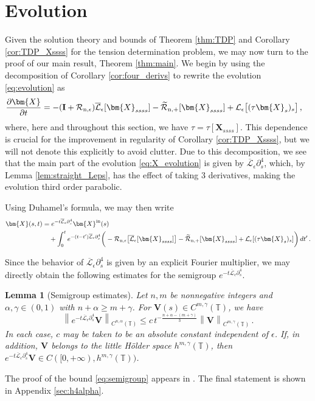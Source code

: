 \documentclass[11pt,reqno]{amsart}
\newcommand{\T}{\mathbb{T}}
\newcommand{\X}{\bm{X}}
\newcommand{\p}{\partial}
\newcommand{\norm}[1]{\left\lVert #1 \right\rVert}
\newcommand{\wt}[1]{\widetilde{#1}}
\newcommand{\mc}[1]{\mathcal{#1}}
\newtheorem{lemma}[theorem]{Lemma}
\theoremstyle{definition}
\begin{document}
\section{Evolution}\label{sec:evolution}
Given the solution theory and bounds of Theorem \ref{thm:TDP} and Corollary \ref{cor:TDP_Xssss} for the tension determination problem, we may now turn to the proof of our main result, Theorem \ref{thm:main}. We begin by using the decomposition of Corollary \ref{cor:four_derivs} to rewrite the evolution \eqref{eq:evolution} as 
\begin{equation}\label{eq:X_evolution}
\begin{aligned}
\frac{\p\X}{\p t} 
&= - ({\bf I}+\mc{R}_{\rm n,\epsilon})\overline{\mc{L}}_\epsilon[\X_{ssss}] - \wt{\mc{R}}_{\rm n,+}[\X_{ssss}] + \mc{L}_\epsilon\big[(\tau\X_s)_s\big]\,,
\end{aligned}
\end{equation}
where, here and throughout this section, we have $\tau=\tau[\X_{ssss}]$. This dependence is crucial for the improvement in regularity of Corollary \ref{cor:TDP_Xssss}, but we will not denote this explicitly to avoid clutter.
Due to this decomposition, we see that the main part of the evolution \eqref{eq:X_evolution} is given by $\overline{\mc{L}}_\epsilon\p_s^4$, which, by Lemma \ref{lem:straight_Leps}, has the effect of taking 3 derivatives, making the evolution third order parabolic. 

Using Duhamel's formula, we may then write
\begin{equation}\label{eq:duhamel}
\begin{aligned}
\X(s,t) &= e^{-t\overline{\mc{L}}_\epsilon\p_s^4}\X^{\rm in}(s) \\
&\quad + \int_0^t e^{-(t-t')\overline{\mc{L}}_\epsilon\p_s^4}\bigg(-\mc{R}_{\rm n,\epsilon}\big[\overline{\mc{L}}_\epsilon[\X_{ssss}]\big] - \wt{\mc{R}}_{\rm n,+}[\X_{ssss}]+ \mc{L}_\epsilon[(\tau\X_s)_s]\bigg)\,dt'\,.
\end{aligned}
\end{equation}


Since the behavior of $\overline{\mc{L}}_\epsilon\p_s^4$ is given by an explicit Fourier multiplier, we may directly obtain the following estimates for the semigroup $e^{-t\overline{\mc{L}}_\epsilon\p_s^4}$. 
%
\begin{lemma}[Semigroup estimates]\label{lem:semigroup}
Let $n,m$ be nonnegative integers and $\alpha,\gamma\in(0,1)$ with $n+\alpha\ge m+\gamma$.
For $\bm{V}(s)\in C^{m,\gamma}(\T)$, we have 
\begin{equation}\label{eq:semigroup}
\norm{e^{-t\overline{\mc{L}}_\epsilon\p_s^4}\bm{V}}_{C^{n,\alpha}(\T)} 
\le c\, t^{-\frac{n+\alpha - (m +\gamma)}{3}} \norm{\bm{V}}_{C^{m,\gamma}(\T)}\,.
\end{equation}
In each case, $c$ may be taken to be an absolute constant independent of $\epsilon$.
If, in addition, $\bm{V}$ belongs to the little H\"older space $h^{m,\gamma}(\T)$, then $e^{-t\overline{\mc{L}}_\epsilon\p_s^4}\bm{V}\in C([0,+\infty),h^{m,\gamma}(\T))$.
\end{lemma}
The proof of the bound \eqref{eq:semigroup} appears in \cite[Lemma 2.2]{ohm2024free}. The final statement is shown in Appendix \ref{sec:h4alpha}.
\end{document}
